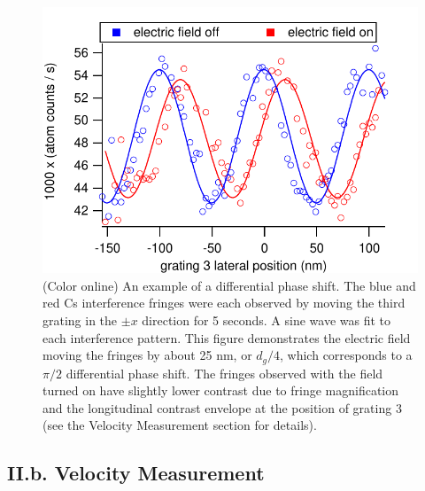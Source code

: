 \documentclass[twocolumn,prl,showpacs,superscriptaddress]{revtex4-1}   %
\begin{document}
\begin{figure}
\includegraphics[width=\linewidth,keepaspectratio]{countsVsGratingPos_150420.pdf}
\caption{\label{phaseShiftExample}(Color online) An example of a differential phase shift. The blue and red Cs interference fringes were each observed by moving the third grating in the $\pm x$ direction for 5 seconds. A sine wave was fit to each interference pattern. This figure demonstrates the electric field moving the fringes by about 25 nm, or $d_g/4$, which corresponds to a $\pi/2$ differential phase shift. The fringes observed with the field turned on have slightly lower contrast due to fringe magnification and the longitudinal contrast envelope at the position of grating 3 (see the Velocity Measurement section for details).}
\end{figure}

\subsection{II.b. Velocity Measurement}
\end{document}
